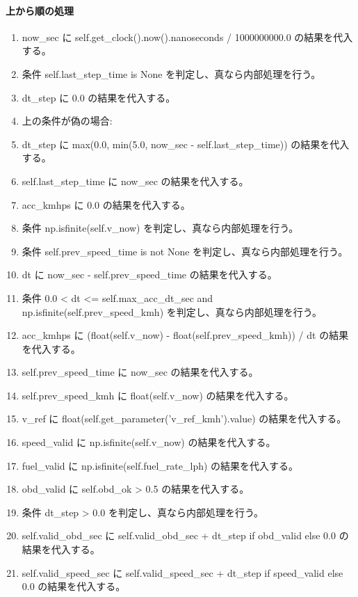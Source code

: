 \documentclass[a4paper,11pt]{article}
\begin{document}
            \paragraph{上から順の処理}
            \begin{enumerate}[leftmargin=1.8em]
            \item now\_sec に self.get\_clock().now().nanoseconds / 1000000000.0 の結果を代入する。
\item 条件 self.last\_step\_time is None を判定し、真なら内部処理を行う。
\item   dt\_step に 0.0 の結果を代入する。
\item   上の条件が偽の場合:
\item   dt\_step に max(0.0, min(5.0, now\_sec - self.last\_step\_time)) の結果を代入する。
\item self.last\_step\_time に now\_sec の結果を代入する。
\item acc\_kmhps に 0.0 の結果を代入する。
\item 条件 np.isfinite(self.v\_now) を判定し、真なら内部処理を行う。
\item   条件 self.prev\_speed\_time is not None を判定し、真なら内部処理を行う。
\item     dt に now\_sec - self.prev\_speed\_time の結果を代入する。
\item     条件 0.0 < dt <= self.max\_acc\_dt\_sec and np.isfinite(self.prev\_speed\_kmh) を判定し、真なら内部処理を行う。
\item       acc\_kmhps に (float(self.v\_now) - float(self.prev\_speed\_kmh)) / dt の結果を代入する。
\item   self.prev\_speed\_time に now\_sec の結果を代入する。
\item   self.prev\_speed\_kmh に float(self.v\_now) の結果を代入する。
\item v\_ref に float(self.get\_parameter('v\_ref\_kmh').value) の結果を代入する。
\item speed\_valid に np.isfinite(self.v\_now) の結果を代入する。
\item fuel\_valid に np.isfinite(self.fuel\_rate\_lph) の結果を代入する。
\item obd\_valid に self.obd\_ok > 0.5 の結果を代入する。
\item 条件 dt\_step > 0.0 を判定し、真なら内部処理を行う。
\item   self.valid\_obd\_sec に self.valid\_obd\_sec + dt\_step if obd\_valid else 0.0 の結果を代入する。
\item   self.valid\_speed\_sec に self.valid\_speed\_sec + dt\_step if speed\_valid else 0.0 の結果を代入する。

\end{enumerate}
\end{document}
